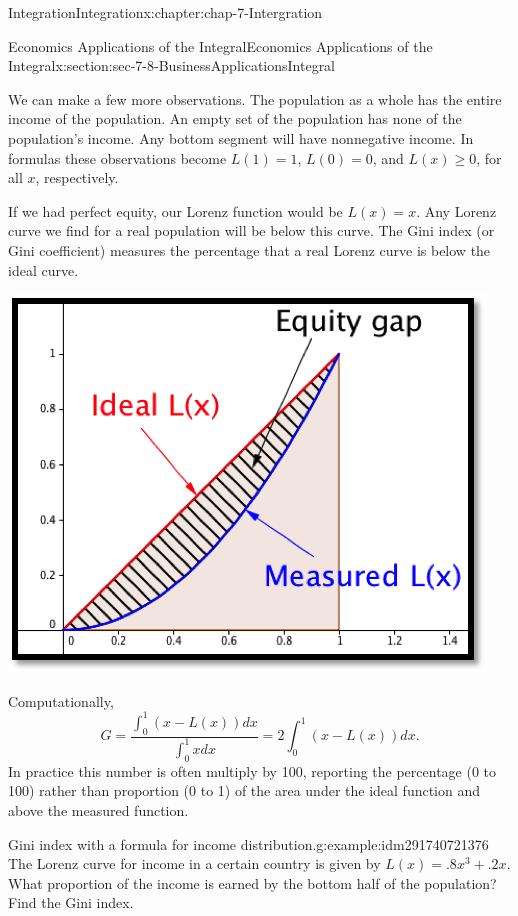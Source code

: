 \documentclass[oneside,10pt,]{book}
\numberwithin{equation}{section}
\begin{document}
\begin{chapterptx}{Integration}{}{Integration}{}{}{x:chapter:chap-7-Intergration}
\begin{sectionptx}{Economics Applications of the Integral}{}{Economics Applications of the Integral}{}{}{x:section:sec-7-8-BusinessApplicationsIntegral}
\par
We can make a few more observations.  The population as a whole has the entire income of the population.  An empty set of the population has none of the population's income.  Any bottom segment will have nonnegative income.  In formulas these observations become \(L(1)=1\), \(L(0)=0\), and \(L(x)\ge 0\), for all \(x\), respectively.%
\par
If we had perfect equity, our Lorenz function would be \(L(x)=x\).  Any Lorenz curve we find for a real population will be below this curve.  The Gini index (or Gini coefficient) measures the percentage that a real Lorenz curve is below the ideal curve.%
\begin{sidebyside}{1}{0.25}{0.25}{0}%
\begin{sbspanel}{0.5}%
\includegraphics[width=\linewidth]{images/sec7-8-15.png}
\end{sbspanel}%
\end{sidebyside}%
\par
Computationally,%
%
\begin{equation*}
G=\frac{\int_0^1 (x-L(x))dx}{\int_0^1 x  dx}=2\int_0^1 (x-L(x))dx.
\end{equation*}
In practice this number is often multiply by 100, reporting the percentage (0 to 100) rather than proportion (0 to 1) of the area under the ideal function and above the measured function.%
\begin{example}{Gini index with a formula for income distribution.}{g:example:idm291740721376}%
The Lorenz curve for income in a certain country is given by \(L(x)=.8x^3+.2x\).  What proportion of the income is earned by the bottom half of the population?  Find the Gini index.%

\end{example}
\end{sectionptx}
\end{chapterptx}
\end{document}
